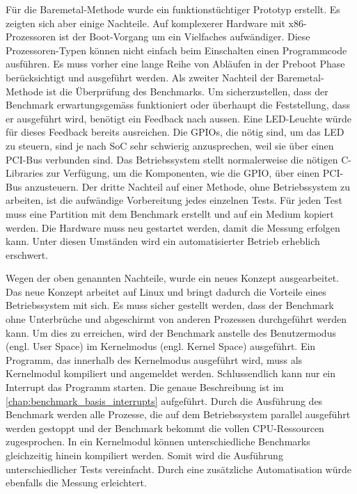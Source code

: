 Für die Baremetal-Methode wurde ein funktionstüchtiger Prototyp erstellt. Es zeigten sich aber einige Nachteile. Auf komplexerer Hardware mit x86-Prozessoren ist der Boot-Vorgang um ein Vielfaches aufwändiger\cite{intel_boot_process}. Diese Prozessoren-Typen können nicht einfach beim Einschalten einen Programmcode ausführen. Es muss vorher eine lange Reihe von Abläufen in der Preboot Phase berücksichtigt und ausgeführt werden. Als zweiter Nachteil der Baremetal-Methode ist die Überprüfung des Benchmarks. Um sicherzustellen, dass der Benchmark erwartungsgemäss funktioniert oder überhaupt die Feststellung, dass er ausgeführt wird, benötigt ein Feedback nach aussen. Eine LED-Leuchte würde für dieses Feedback bereits ausreichen. Die GPIOs, die nötig sind, um das LED zu steuern, sind je nach SoC sehr schwierig anzusprechen, weil sie über einen PCI-Bus verbunden sind. Das Betriebssystem stellt normalerweise die nötigen C-Libraries zur Verfügung, um die Komponenten, wie die GPIO, über einen PCI-Bus anzusteuern. Der dritte Nachteil auf einer Methode, ohne Betriebssystem zu arbeiten, ist die aufwändige Vorbereitung jedes einzelnen Tests. Für jeden Test muss eine Partition mit dem Benchmark erstellt und auf ein Medium kopiert werden. Die Hardware muss neu gestartet werden,
damit die Messung erfolgen kann. Unter diesen Umständen wird ein automatisierter Betrieb erheblich erschwert.
\par
Wegen der oben genannten Nachteile, wurde ein neues Konzept ausgearbeitet. Das neue Konzept arbeitet auf Linux und bringt dadurch die Vorteile eines Betriebssystem mit sich. Es muss sicher gestellt werden, dass der Benchmark ohne Unterbrüche und abgeschirmt von anderen Prozessen durchgeführt werden kann. Um dies zu erreichen, wird der Benchmark anstelle des Benutzermodus (engl. User Space) im Kernelmodus (engl. Kernel Space) ausgeführt\cite{Mandl2010}. Ein Programm, das innerhalb des Kernelmodus ausgeführt wird, muss als Kernelmodul kompiliert und angemeldet werden. Schlussendlich kann nur ein Interrupt das Programm starten. Die genaue Beschreibung ist im \autoref{chap:benchmark_basis_interrupts} aufgeführt. Durch die Ausführung des Benchmark werden alle Prozesse, die auf dem Betriebssystem parallel ausgeführt werden gestoppt und der Benchmark bekommt die vollen CPU-Ressourcen zugesprochen. In ein Kernelmodul können unterschiedliche Benchmarks gleichzeitig hinein kompiliert werden. Somit wird die Ausführung unterschiedlicher Tests vereinfacht. Durch eine zusätzliche Automatisation würde ebenfalls die Messung erleichtert. 

 



 

